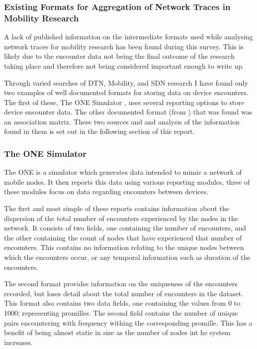 \subsubsection{Existing Formats for Aggregation of Network Traces in Mobility Research}

A lack of published information on the intermediate formats used while analysing network traces for mobility research has been found during this survey. This is likely due to the encounter data not being the final outcome of the research taking place and therefore not being considered important enough to write up.

Through varied searches of DTN, Mobility, and SDN research I have found only two examples of well documented formats for storing data on device encounters. The first of these, The ONE Simulator \cite{Keranen2009}, uses several reporting options to store device encounter data. The other documented format (from \cite{Thakur2012}) that was found was an association matrix. These two sources and and analysis of the information found in them is set out in the following section of this report.

\subsubsection{The ONE Simulator \cite{Keranen2009}}
The ONE is a simulator which generates data intended to mimic a network of mobile nodes. It then reports this data using various reporting modules, three of these modules focus on data regarding encounters between devices.

The first and most simple of these reports contains information about the dispersion of the total number of encounters experienced by the nodes in the network. It consists of two fields, one containing the number of encounters, and the other containing the count of nodes that have experienced that number of encounters. This contains no information relating to the unique nodes between which the encounters occur, or any temporal information such as duration of the encounters. 

The second format provides information on the uniqueness of the encounters recorded, but loses detail about the total number of encounters in the dataset. This format also contains two data fields, one containing the values from 0 to 1000; representing promilles. The second field contains the number of unique pairs encountering with frequency withing the corresponding promille. This has a benefit of being almost static in size as the number of nodes int he system increases. 

